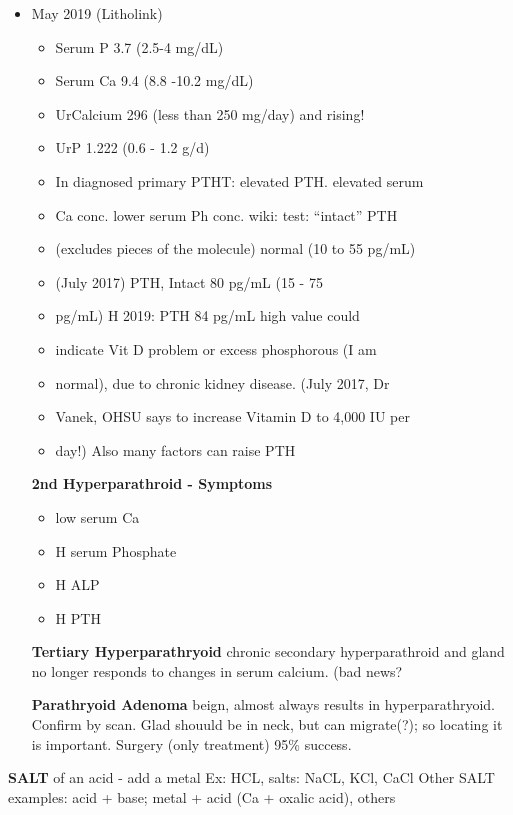 \begin{itemize}
\item
  May 2019 (Litholink)

  \begin{itemize}
  \item
    Serum P 3.7 (2.5-4 mg/dL)
  \item
    Serum Ca 9.4 (8.8 -10.2 mg/dL)
  \item
    UrCalcium 296 (less than 250 mg/day) and rising!
  \item
    UrP 1.222 (0.6 - 1.2 g/d)
  \item
    In diagnosed primary PTHT: elevated PTH. elevated serum
  \item
    Ca conc. lower serum Ph conc. wiki: test: ``intact'' PTH
  \item
    (excludes pieces of the molecule) normal (10 to 55 pg/mL)
  \item
    (July 2017) PTH, Intact 80 pg/mL (15 - 75
  \item
    pg/mL) H 2019: PTH 84 pg/mL high value could
  \item
    indicate Vit D problem or excess phosphorous (I am
  \item
    normal), due to chronic kidney disease. (July 2017, Dr
  \item
    Vanek, OHSU says to increase Vitamin D to 4,000 IU per
  \item
    day!) Also many factors can raise PTH
  \end{itemize}

  \textbf{2nd Hyperparathroid - Symptoms}

  \begin{itemize}
  \tightlist
  \item
    low serum Ca
  \item
    H serum Phosphate
  \item
    H ALP
  \item
    H PTH
  \end{itemize}

  \textbf{Tertiary Hyperparathryoid} chronic secondary hyperparathroid
  and gland no longer responds to changes in serum calcium. (bad news?

  \textbf{Parathryoid Adenoma} beign, almost always results in
  hyperparathryoid. Confirm by scan. Glad shouuld be in neck, but can
  migrate(?); so locating it is important. Surgery (only treatment) 95\%
  success.
\end{itemize}

\textbf{SALT} of an acid - add a metal Ex: HCL, salts: NaCL, KCl, CaCl
Other SALT examples: acid + base; metal + acid (Ca + oxalic acid),
others

